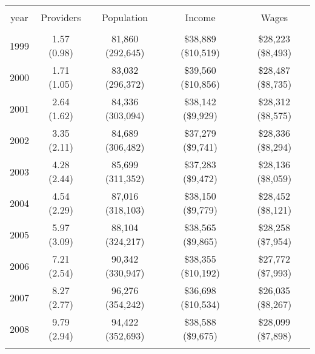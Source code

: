 
\begin{table}[!htbp] \centering 
  \caption{} 
  \label{} 
\begin{tabular}{@{\extracolsep{5pt}} ccccc} 
\\[-1.8ex]\hline 
\hline \\[-1.8ex] 
year & Providers & Population & Income & Wages \\ 
\hline \\[-1.8ex] 
1999 & 1.57 (0.98) & 81,860 (292,645) & \$38,889 (\$10,519) & \$28,223 (\$8,493) \\ 
2000 & 1.71 (1.05) & 83,032 (296,372) & \$39,560 (\$10,856) & \$28,487 (\$8,735) \\ 
2001 & 2.64 (1.62) & 84,336 (303,094) & \$38,142 (\$9,929) & \$28,312 (\$8,575) \\ 
2002 & 3.35 (2.11) & 84,689 (306,482) & \$37,279 (\$9,741) & \$28,336 (\$8,294) \\ 
2003 & 4.28 (2.44) & 85,699 (311,352) & \$37,283 (\$9,472) & \$28,136 (\$8,059) \\ 
2004 & 4.54 (2.29) & 87,016 (318,103) & \$38,150 (\$9,779) & \$28,452 (\$8,121) \\ 
2005 & 5.97 (3.09) & 88,104 (324,217) & \$38,565 (\$9,865) & \$28,258 (\$7,954) \\ 
2006 & 7.21 (2.54) & 90,342 (330,947) & \$38,355 (\$10,192) & \$27,772 (\$7,993) \\ 
2007 & 8.27 (2.77) & 96,276 (354,242) & \$36,698 (\$10,534) & \$26,035 (\$8,267) \\ 
2008 & 9.79 (2.94) & 94,422 (352,693) & \$38,588 (\$9,675) & \$28,099 (\$7,898) \\ 
\hline \\[-1.8ex] 
\end{tabular} 
\end{table} 
